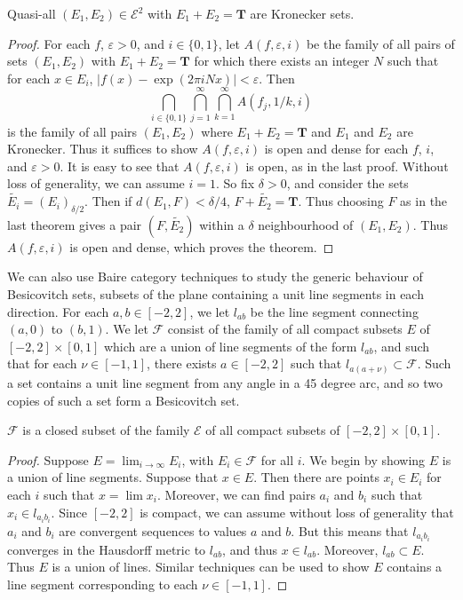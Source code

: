 \begin{theorem}
	Quasi-all $(E_1,E_2) \in \mathcal{E}^2$ with $E_1 + E_2 = \mathbf{T}$ are Kronecker sets.
\end{theorem}
\begin{proof}
	For each $f$, $\varepsilon > 0$, and $i \in \{ 0, 1 \}$, let $A(f,\varepsilon,i)$ be the family of all pairs of sets $(E_1, E_2)$ with $E_1 + E_2 = \mathbf{T}$ for which there exists an integer $N$ such that for each  $x \in E_i$, $|f(x) - \exp(2 \pi i N x)| < \varepsilon$. Then
	\[ \bigcap_{i \in \{ 0, 1 \}} \bigcap_{j = 1}^\infty \bigcap_{k = 1}^\infty A(f_j,1/k,i) \]
	is the family of all pairs $(E_1,E_2)$ where $E_1 + E_2 = \mathbf{T}$ and $E_1$ and $E_2$ are Kronecker. Thus it suffices to show $A(f,\varepsilon,i)$ is open and dense for each $f$, $i$, and $\varepsilon > 0$. It is easy to see that $A(f,\varepsilon,i)$ is open, as in the last proof. Without loss of generality, we can assume $i = 1$. So fix $\delta > 0$, and consider the sets $\widetilde{E_i} = (E_i)_{\delta/2}$. Then if $d(E_1,F) < \delta/4$, $F + \tilde{E_2} = \mathbf{T}$. Thus choosing $F$ as in the last theorem gives a pair $(F,\tilde{E_2})$ within a $\delta$ neighbourhood of $(E_1,E_2)$. Thus $A(f,\varepsilon,i)$ is open and dense, which proves the theorem.
\end{proof}

We can also use Baire category techniques to study the generic behaviour of Besicovitch sets, subsets of the plane containing a unit line segments in each direction. For each $a,b \in [-2,2]$, we let $l_{ab}$ be the line segment connecting $(a,0)$ to $(b,1)$. We let $\mathcal{F}$ consist of the family of all compact subsets $E$ of $[-2,2] \times [0,1]$ which are a union of line segments of the form $l_{ab}$, and such that for each $\nu \in [-1,1]$, there exists $a \in [-2,2]$ such that $l_{a(a+\nu)} \subset \mathcal{F}$. Such a set contains a unit line segment from any angle in a 45 degree arc, and so two copies of such a set form a Besicovitch set.

\begin{lemma}
	$\mathcal{F}$ is a closed subset of the family $\mathcal{E}$ of all compact subsets of $[-2,2] \times [0,1]$.
\end{lemma}
\begin{proof}
	Suppose $E = \lim_{i \to \infty} E_i$, with $E_i \in \mathcal{F}$ for all $i$. We begin by showing $E$ is a union of line segments. Suppose that $x \in E$. Then there are points $x_i \in E_i$ for each $i$ such that $x = \lim x_i$. Moreover, we can find pairs $a_i$ and $b_i$ such that $x_i \in l_{a_ib_i}$. Since $[-2,2]$ is compact, we can assume without loss of generality that $a_i$ and $b_i$ are convergent sequences to values $a$ and $b$. But this means that $l_{a_ib_i}$ converges in the Hausdorff metric to $l_{ab}$, and thus $x \in l_{ab}$. Moreover, $l_{ab} \subset E$. Thus $E$ is a union of lines. Similar techniques can be used to show $E$ contains a line segment corresponding to each $\nu \in [-1,1]$.
 \end{proof}

